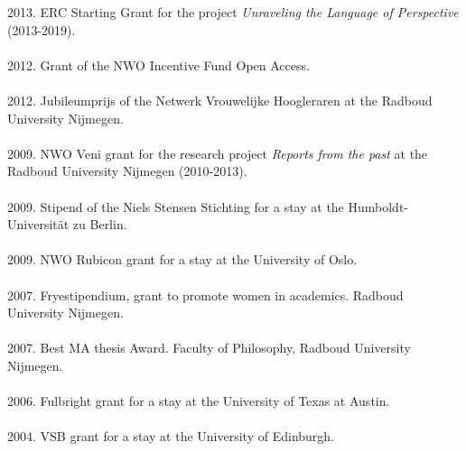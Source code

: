 \documentclass[a4paper,11pt]{article}
\begin{document}
2013. ERC Starting Grant for the project \emph{Unraveling the Language of Perspective} (2013-2019).\\\\
2012. Grant of the NWO Incentive Fund Open Access.\\\\
2012. Jubileumprijs of the Netwerk Vrouwelijke Hoogleraren at the Radboud University Nijmegen.\\\\
2009.  NWO Veni grant for the research project \emph{Reports from the past} at the Radboud University Nijmegen (2010-2013).\\\\
2009.  Stipend of the Niels Stensen Stichting for a stay at the Humboldt-Universit\"at zu Berlin.\\\\
2009. NWO Rubicon grant for a stay at the University of Oslo.\\\\
2007. Fryestipendium, grant to promote women in academics. Radboud University Nijmegen.\\\\ 
2007. Best MA thesis Award. Faculty of Philosophy, Radboud University Nijmegen.\\\\  
2006. Fulbright grant for a stay at the University of Texas at Austin.\\\\ 
2004. VSB grant for a stay at the University of
Edinburgh.\\
\end{document}
